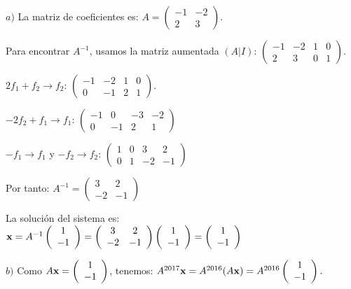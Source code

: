 \begin{myproof}
$a)$ La matriz de coeficientes es: $A = \left( \begin{array}{cc} -1 & -2 \\ 2 & 3 \end{array} \right).$

Para encontrar $A^{-1}$, usamos la matriz aumentada $(A|I)$: $\left(\begin{array}{cc|cc}
-1 & -2 & 1 & 0 \\
2 & 3 & 0 & 1
\end{array}\right).$

$2f_1 + f_2 \to f_2$: $\left(\begin{array}{cc|cc}
-1 & -2 & 1 & 0 \\
0 & -1 & 2 & 1
\end{array}\right).$

$-2f_2 + f_1 \to f_1$: $\left(\begin{array}{cc|cc}
-1 & 0 & -3 & -2 \\
0 & -1 & 2 & 1
\end{array}\right)$

$-f_1 \to f_1$ y $-f_2 \to f_2$: $\left(\begin{array}{cc|cc}
1 & 0 & 3 & 2 \\
0 & 1 & -2 & -1
\end{array}\right)$

Por tanto: $A^{-1} = \left( \begin{array}{cc} 3 & 2 \\ -2 & -1 \end{array} \right)$

La solución del sistema es: ${\bf x} = A^{-1} \left( \begin{array}{c} 1 \\ -1 \end{array} \right) = \left( \begin{array}{cc} 3 & 2 \\ -2 & -1 \end{array} \right) \left( \begin{array}{c} 1 \\ -1 \end{array} \right) = \left( \begin{array}{c} 1 \\ -1 \end{array} \right)$

$b)$ Como $A{\bf x} = \left( \begin{array}{c} 1 \\ -1 \end{array} \right)$, tenemos: $A^{2017}{\bf x} = A^{2016}(A{\bf x}) = A^{2016} \left( \begin{array}{c} 1 \\ -1 \end{array} \right).$


\end{myproof}

